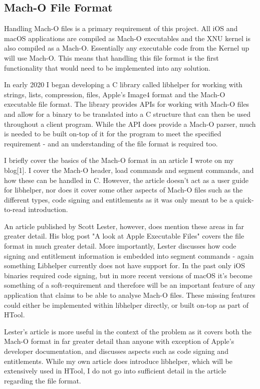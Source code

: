 \subsection{Mach-O File Format}

Handling Mach-O files is a primary requirement of this project. All iOS and macOS applications are compiled as Mach-O executables and the XNU kernel is also compiled as a Mach-O. Essentially any executable code from the Kernel up will use Mach-O. This means that handling this file format is the first functionality that would need to be implemented into any solution.

In early 2020 I began developing a C library called libhelper\cite{github-libhelper} for working with strings, lists, compression, files, Apple's Image4 format and the Mach-O executable file format. The library provides APIs for working with Mach-O files and allow for a binary to be translated into a C structure that can then be used throughout a client program. While the API does provide a Mach-O parser, much is needed to be built on-top of it for the program to meet the specified requirement - and an understanding of the file format is required too. 

I briefly cover the basics of the Mach-O format in an article I wrote on my blog[1]. I cover the Mach-O header, load commands and segment commands, and how these can be handled in C. However, the article doesn't act as a user guide for libhelper, nor does it cover some other aspects of Mach-O files such as the different types, code signing and entitlements as it was only meant to be a quick-to-read introduction.

An article published by Scott Lester, however, does mention these areas in far greater detail. His blog post "A look at Apple Executable Files"\cite{lester-macho} covers the file format in much greater detail. More importantly, Lester discusses how code signing and entitlement information is embedded into segment commands - again something Libhelper currently does not have support for. In the past only iOS binaries required code signing, but in more recent versions of macOS it's become something of a soft-requirement and therefore will be an important feature of any application that claims to be able to analyse Mach-O files. These missing features could either be implemented within libhelper directly, or built on-top as part of HTool.

Lester's article is more useful in the context of the problem as it covers both the Mach-O format in far greater detail than anyone with exception of Apple's developer documentation, and discusses aspects such as code signing and entitlements. While my own article does introduce libhelper, which will be extensively used in HTool, I do not go into sufficient detail in the article regarding the file format.